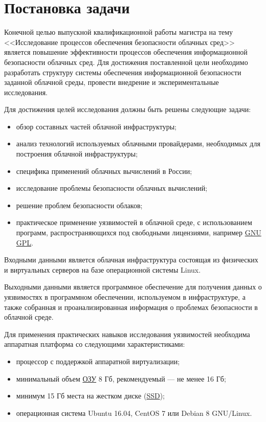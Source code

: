 \section{Постановка задачи}

Конечной целью выпускной квалификационной работы магистра на тему <<Исследование процессов обеспечения безопасности облачных сред>> является повышение эффективности процессов обеспечения информационной безопасности облачных сред.
Для достижения поставленной цели необходимо разработать структуру системы обеспечения информационной безопасности заданной облачной среды, провести внедрение и экспериментальные исследования.

Для достижения целей исследования должны быть решены следующие задачи:
\begin{itemize}
  \item обзор составных частей облачной инфраструктуры;
  \item анализ технологий используемых облачными провайдерами, необходимых для построения облачной инфраструктуры;
  \item специфика применений облачных вычислений в России;
  \item исследование проблемы безопасности облачных вычислений;
  \item решение проблем безопасности облаков;
  \item практическое применение уязвимостей в облачной среде, с использованием программ, распространяющихся под свободными лицензиями, например \hyperlink{gnu}{GNU} \hyperlink{gpl}{GPL}.
\end{itemize}

Входными данными является облачная инфраструктура состоящая из физических и виртуальных серверов на базе операционной системы Linux.

Выходными данными является программное обеспечение для получения данных о уязвимостях в программном обеспечении, используемом в инфраструктуре, а также собранная и проанализированная информация о проблемах безопасности в облачной среде.

Для применения практических навыков исследования уязвимостей необходима аппаратная платформа со следующими характеристиками:
\begin{itemize}
  \item процессор с поддержкой аппаратной виртуализации;
  \item минимальный объем \hyperlink{ram}{ОЗУ} 8 Гб, рекомендуемый --- не менее 16 Гб;
  \item минимум 15 Гб места на жестком диске (\hyperlink{ssd}{SSD});
  \item операционная система Ubuntu 16.04, CentOS 7 или Debian 8 GNU/Linux.
\end{itemize}

